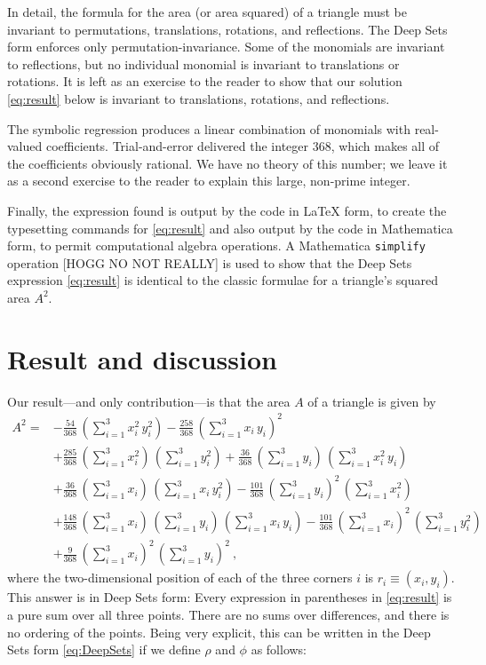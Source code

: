 \documentclass[12pt]{article}
\begin{document}
In detail, the formula for the area (or area squared) of a triangle must be invariant to permutations, translations, rotations, and reflections.
The Deep Sets form enforces only permutation-invariance.
Some of the monomials are invariant to reflections, but no individual monomial is invariant to translations or rotations.
It is left as an exercise to the reader to show that our solution \eqref{eq:result} below is invariant to translations, rotations, and reflections.

The symbolic regression produces a linear combination of monomials with real-valued coefficients.
Trial-and-error delivered the integer 368, which makes all of the coefficients obviously rational.
We have no theory of this number; we leave it as a second exercise to the reader to explain this large, non-prime integer.

Finally, the expression found is output by the code in LaTeX form, to create the typesetting commands for \eqref{eq:result} and also output by the code in Mathematica form, to permit computational algebra operations.
A Mathematica \texttt{simplify} operation [HOGG NO NOT REALLY] is used to show that the Deep Sets expression \eqref{eq:result} is identical to the classic formulae for a triangle's squared area $A^2$.

\section{Result and discussion}\label{sec:result}
Our result---and only contribution---is that the area $A$ of a triangle is given by
\begin{align}
A^2 = &
-\frac{ 54}{368}\,(\sum_{i=1}^3 x_i^2\,y_i^2) 
-\frac{258}{368}\,(\sum_{i=1}^3 x_i\,y_i)^2 \nonumber \\ &
+\frac{285}{368}\,(\sum_{i=1}^3 x_i^2)\,(\sum_{i=1}^3 y_i^2) 
+\frac{ 36}{368}\,(\sum_{i=1}^3 y_i)\,(\sum_{i=1}^3 x_i^2\,y_i) \nonumber \\ &
+\frac{ 36}{368}\,(\sum_{i=1}^3 x_i)\,(\sum_{i=1}^3 x_i\,y_i^2) 
-\frac{101}{368}\,(\sum_{i=1}^3 y_i)^2\,(\sum_{i=1}^3 x_i^2) \nonumber \\ &
+\frac{148}{368}\,(\sum_{i=1}^3 x_i)\,(\sum_{i=1}^3 y_i)\,(\sum_{i=1}^3 x_i\,y_i) 
-\frac{101}{368}\,(\sum_{i=1}^3 x_i)^2\,(\sum_{i=1}^3 y_i^2) \nonumber \\ &
+\frac{  9}{368}\,(\sum_{i=1}^3 x_i)^2\,(\sum_{i=1}^3 y_i)^2 ~, \label{eq:result}
\end{align}
where the two-dimensional position of each of the three corners $i$ is $r_i \equiv (x_i, y_i)$.
This answer is in Deep Sets form:
Every expression in parentheses in \eqref{eq:result} is a pure sum over all three points.
There are no sums over differences, and there is no ordering of the points.
Being very explicit, this can be written in the Deep Sets form \eqref{eq:DeepSets} if we define $\rho$ and $\phi$ as follows:
\end{document}
